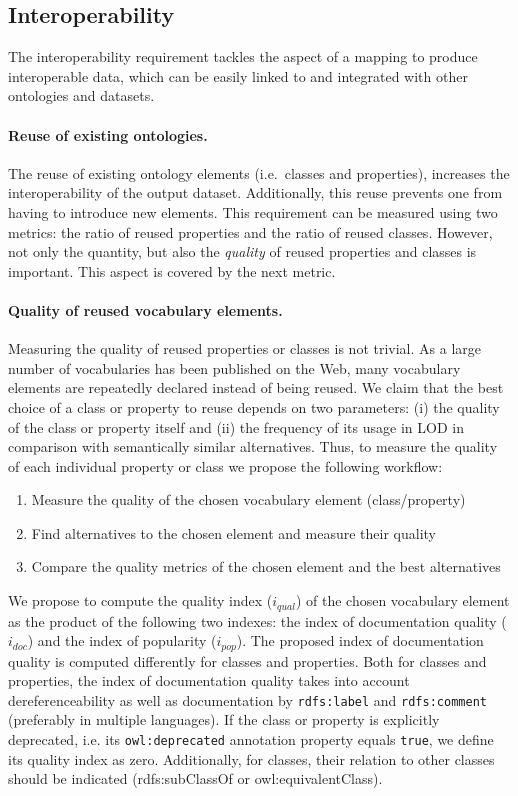 \subsection{Interoperability}
\label{inter}

The interoperability requirement tackles the aspect of a mapping to produce interoperable data, which can be easily linked to and integrated with other ontologies and datasets.

\paragraph{Reuse of existing ontologies.} 
The reuse of existing ontology elements (i.e.\ classes and properties), increases the interoperability of the output dataset.
Additionally, this reuse prevents one from having to introduce new elements. 
This requirement can be measured using two metrics: the ratio of reused properties and the ratio of reused classes.
However, not only the quantity, but also the \emph{quality} of reused properties and classes is important.
This aspect is covered by the next metric.

\paragraph{Quality of reused vocabulary elements.}
\label{par:quality_reused}
Measuring the quality of reused properties or classes is not trivial.
As a large number of vocabularies has been published on the Web, many vocabulary elements are repeatedly declared instead of being reused.
We claim that the best choice of a class or property to reuse depends on two parameters:
(i) the quality of the class or property itself and 
(ii) the frequency of its usage in LOD in comparison with semantically similar alternatives.
Thus, to measure the quality of each individual property or class we propose the following workflow: 
\begin{enumerate}
\item Measure the quality of the chosen vocabulary element (class/property)
\item Find alternatives to the chosen element and measure their quality
\item Compare the quality metrics of the chosen element and the best alternatives
\end{enumerate}

We propose to compute the quality index ($i_\mathit{qual}$) of the chosen vocabulary element as the product of the following two indexes:
the index of documentation quality ($i_\mathit{doc}$) and the index of popularity ($i_\mathit{pop}$).
The proposed index of documentation quality is computed differently for classes and properties.
Both for classes and properties, the index of documentation quality takes into account dereferenceability as well as documentation by \texttt{rdfs:label} and \texttt{rdfs:comment} (preferably in multiple languages).
If the class or property is explicitly deprecated, i.e. its \texttt{owl:deprecated} annotation property equals \texttt{true}, we define its quality index as zero.
Additionally, for classes, their relation to other classes should be indicated (rdfs:subClassOf or owl:equivalentClass).

